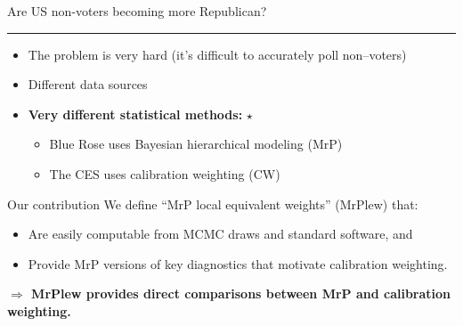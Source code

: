 
\begin{frame}{Are US non-voters becoming more Republican?}

\vspace{1em}
\pause
%
\hrule
\begin{itemize}
\item The problem is very hard (it's difficult to accurately poll non--voters)
\item Different data sources
%
%
\item \textbf{Very different statistical methods:} $\star$
\begin{itemize}
    \item Blue Rose uses Bayesian hierarchical modeling (MrP)
    \item The CES uses calibration weighting (CW)
\end{itemize}
%
\end{itemize}

\pause

\begin{block}{Our contribution}
    We define ``MrP local equivalent weights'' (MrPlew) that:
\begin{itemize}
    \item Are easily computable from MCMC draws and standard software, and
    \item Provide MrP versions of key diagnostics that motivate calibration weighting.
\end{itemize}
%
\textbf{$\Rightarrow$ MrPlew provides direct comparisons between
MrP and calibration weighting.}
%
\end{block}

\end{frame}


